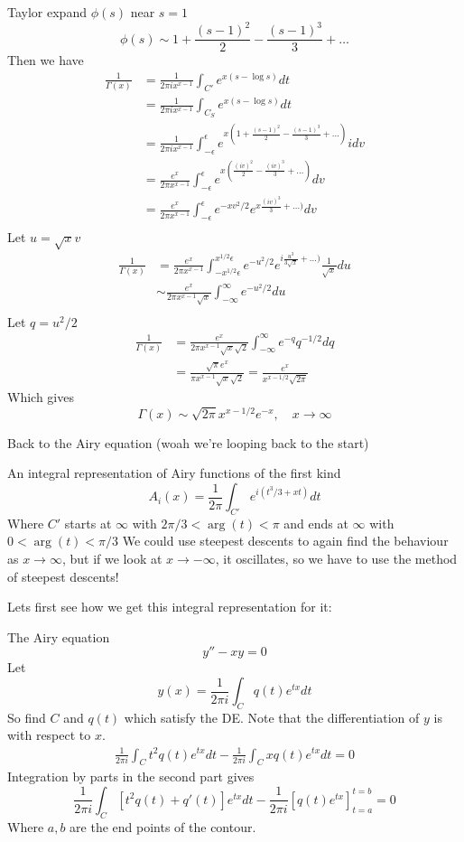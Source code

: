 \documentclass{X:/Documents/Coding/Latex/myassignment}
\begin{document}
Taylor expand $\phi(s)$ near $s=1$
\[\phi(s) \sim 1 + \frac{(s-1)^2}{2} - \frac{(s-1)^3}{3} + \ldots\]
Then we have
\begin{align*}
    \frac1{\Gamma(x)} &= \frac{1}{2\pi i x^{x-1}} \int_{C'} e^{x(s-\log s)} dt\\
    &=\frac{1}{2\pi i x^{x-1}} \int_{C_S} e^{x(s-\log s)} dt\\
    &=\frac{1}{2\pi i x^{x-1}} \int_{-\epsilon}^{\epsilon} e^{x(1 + \frac{(s-1)^2}{2} - \frac{(s-1)^3}{3} + \ldots)}i dv\\
    &=\frac{e^{x}}{2\pi x^{x-1}} \int_{-\epsilon}^{\epsilon} e^{x(\frac{(iv)^2}{2} - \frac{(iv)^3}{3} + \ldots)} dv\\
    &=\frac{e^{x}}{2\pi x^{x-1}} \int_{-\epsilon}^{\epsilon} e^{-xv^2/2} e^{x\frac{(iv)^3}{3} + \ldots)} dv\\
\end{align*}
Let $u=\sqrt{x}v$
\begin{align*}
    \frac1{\Gamma(x)} &= \frac{e^{x}}{2\pi x^{x-1}} \int_{-x^{1/2}\epsilon}^{x^{1/2}\epsilon} e^{-u^2/2} e^{i\frac{u^3}{3\sqrt{x}} + \ldots)} \frac{1}{\sqrt{x}}du\\
    &\sim \frac{e^{x}}{2\pi x^{x-1}\sqrt{x}} \int_{-\infty}^{\infty} e^{-u^2/2}du\\
\end{align*}
Let $q = u^2/2$
\begin{align*}
    \frac1{\Gamma(x)} &= \frac{e^{x}}{2\pi x^{x-1}\sqrt{x}\sqrt{2}} \int_{-\infty}^{\infty} e^{-q}q^{-1/2}dq\\
    &= \frac{\sqrt{\pi}e^x}{\pi x^{x-1} \sqrt{x}\sqrt{2}} = \frac{e^x}{x^{x-1/2} \sqrt{2\pi}}
\end{align*}
Which gives
\[\Gamma(x) \sim \sqrt{2\pi} x^{x-1/2} e^{-x}, \quad x\to\infty\]


Back to the Airy equation (woah we're looping back to the start)

An integral representation of Airy functions of the first kind
\[A_i(x) = \frac1{2\pi} \int_{C'} e^{i(t^3/3 + xt)}dt\]
Where $C'$ starts at $\infty$ with $2\pi/3 < \arg(t) < \pi$ and ends at $\infty$ with $0<\arg(t) < \pi/3$
We could use steepest descents to again find the behaviour as $x\to\infty$, but if we look at $x\to-\infty$, it oscillates, so we have to use the method of steepest descents!

Lets first see how we get this integral representation for it:

The Airy equation
\[y'' - xy = 0\]
Let 
\[y(x) = \frac1{2\pi i} \int_C q(t)e^{tx} dt\]
So find $C$ and $q(t)$ which satisfy the DE.
Note that the differentiation of $y$ is with respect to $x$.
\begin{align*}
    \frac1{2\pi i} \int_C t^2 q(t)e^{tx} dt - \frac1{2\pi i} \int_Cx q(t)e^{tx} dt =0
\end{align*}
Integration by parts in the second part gives
\[\frac{1}{2\pi i} \int_C \left[t^2 q(t) + q'(t)\right] e^{tx} dt - \frac1{2\pi i} \left[q(t) e^{tx}\right]_{t=a}^{t=b} = 0
\]
Where $a,b$ are the end points of the contour.
\end{document}
